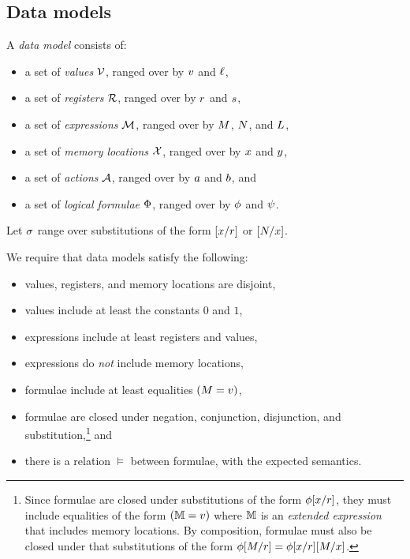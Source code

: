 
\subsection{Data models}
\label{sec:data:models}
A \emph{data model} consists of:
\begin{itemize}
\item a set of \emph{values} $\mathcal{V}$, ranged over by
  $v$ and $\ell$,
\item a set of \emph{registers} $\mathcal{R}$, ranged over by
  $r$ and $s$,
\item a set of \emph{expressions} $\mathcal{M}$, ranged over by
  $M$, $N$, and $L$, %
\item a set of \emph{memory locations} $\mathcal{X}$, ranged over by $x$ and
  $y$, 
\item a set of \emph{actions} $\mathcal{A}$, ranged over by $a$ and $b$, and
\item a set of \emph{logical formulae} $\Phi$, ranged over by
  $\phi$ and $\psi$.
\end{itemize}

Let $\sigma$ range over substitutions of the form
$[x/r]$ or $[N/x]$.

We require that data models satisfy the following:
\begin{itemize}
\item values, registers, and memory locations are disjoint,
\item values include at least the constants $0$ and $1$,
\item expressions include at least registers and values,
\item expressions do \emph{not} include memory locations, %
\item formulae include at least %
  equalities %
  $(M=v)$, %
\item formulae are closed under negation, conjunction, disjunction, and
  substitution,\footnote{Since formulae are closed under substitutions of the
    form $\phi[x/r]$, they must include equalities of the form
    $(\mathbb{M}=v)$ where $\mathbb{M}$ is an \emph{extended expression} that
    includes memory locations.  By composition, formulae must also be closed
    under that substitutions of the form
    $\phi[M/r]=\phi[x/r][M/x]$.} and
\item there is a relation $\vDash$ between formulae, with the expected semantics.
\end{itemize}

